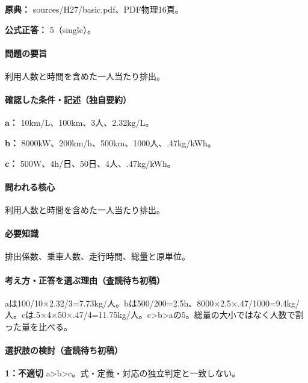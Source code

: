 \noindent\textbf{原典：} sources/H27/basic.pdf、PDF物理16頁。

\textbf{公式正答：} 5（single）。

\paragraph{問題の要旨} 利用人数と時間を含めた一人当たり排出。

\paragraph{確認した条件・記述（独自要約）}\mbox{}\par

\noindent\textbf{a：} 10km/L、100km、3人、2.32kg/L。\par

\noindent\textbf{b：} 8000kW、200km/h、500km、1000人、.47kg/kWh。\par

\noindent\textbf{c：} 500W、4h/日、50日、4人、.47kg/kWh。\par

\paragraph{問われる核心} 利用人数と時間を含めた一人当たり排出。

\paragraph{必要知識} 排出係数、乗車人数、走行時間、総量と原単位。

\paragraph{考え方・正答を選ぶ理由（査読待ち初稿）} aは100/10×2.32/3=\allowbreak{}7.73kg/人。bは500/200=\allowbreak{}2.5h、8000×2.5×.47/1000=\allowbreak{}9.4kg/人。cは.5×4×50×.47/4=\allowbreak{}11.75kg/人。c>b>aの5。総量の大小ではなく人数で割った量を比べる。

\paragraph{選択肢の検討（査読待ち初稿）}\mbox{}\par

\noindent\textbf{1：不適切} a>b>c。式・定義・対応の独立判定と一致しない。\par


